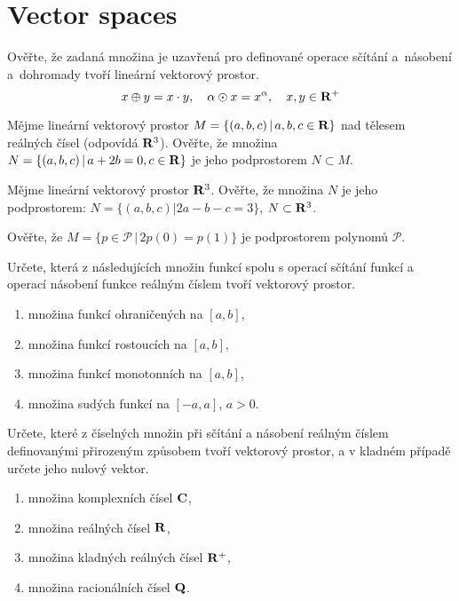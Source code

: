 \documentclass[a4paper,10pt]{book}
\def\Real{{\rm\bf R}}
\def\Rd{{{\rm\bf R}^{\rm 3}}}
\def\where{\,|\,}                    %
\begin{document}
\section{Vector spaces}
\exercise \label{ex:vek1} Ověřte, že zadaná množina je uzavřená pro definované operace sčítání a~násobení a~dohromady tvoří lineární vektorový prostor. 
\begin{equation}
  x\oplus y=x\cdot y, \quad \alpha \odot x = x^\alpha, \quad x,y \in \Real^{+}  \nonumber
\end{equation}

\exercise \label{ex:vek2} Mějme lineární vektorový prostor $M=\{(a,b,c)\where a,b,c\in\Real\}$ nad tělesem reálných čísel (odpovídá $\Rd$). 
Ověřte, že množina $N=\{(a,b,c)\where a+2b=0, c\in\Real\}$ je jeho podprostorem $N\subset M$. 

\exercise \label{ex:vek3} Mějme lineární vektorový prostor $\Rd$. Ověřte, že množina $N$ je jeho podprostorem: $N=\{(a,b,c)| 2a-b-c=3\}$, $N\subset \Rd$.

\exercise \label{ex:vek4} Ověřte, že $M=\{p\in\mathcal{P}\where 2p(0)=p(1)\}$ je podprostorem polynomů $\mathcal{P}$.

\exercise \label{ex:vek5} Určete, která z následujících množin funkcí spolu s operací sčítání
funkcí a operací násobení funkce reálným číslem tvoří vektorový prostor.
\begin{enumerate}[label=\alph*)]
\item množina funkcí ohraničených na $[a, b]$,
\item množina funkcí rostoucích na $[a, b]$,
\item množina funkcí monotonních na $[a, b]$,
\item množina sudých funkcí na $[-a, a]$, $a > 0$.
\end{enumerate}

\exercise \label{ex:vek6} Určete, které z číselných množin při sčítání a násobení reálným číslem definovanými
přirozeným způsobem tvoří vektorový prostor, a v kladném případě určete jeho nulový
vektor.
\begin{enumerate}[label=\alph*)]
\item množina komplexních čísel $\rm\bf{C}$,
\item množina reálných čísel $\Real$,
\item množina kladných reálných čísel $\Real^+$,
\item množina racionálních čísel $\rm\bf{Q}$.
\end{enumerate}
\end{document}
